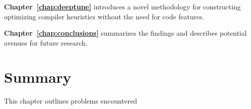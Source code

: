 \textbf{Chapter~\ref{chap:deeptune}} introduces a novel methodology for constructing optimizing compiler heuristics without the need for code features.

\textbf{Chapter~\ref{chap:conclusions}} summarizes the findings and describes potential avenues for future research.


\section{Summary}

This chapter outlines problems encountered